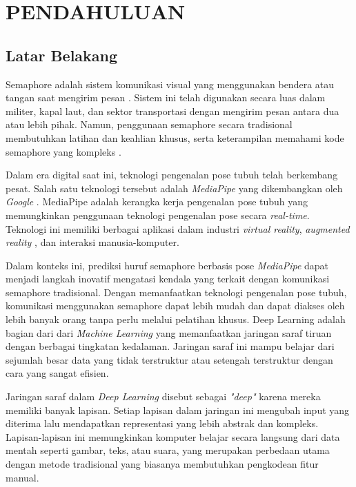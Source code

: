 \chapter{PENDAHULUAN}

\section{Latar Belakang}

Semaphore adalah sistem komunikasi visual yang menggunakan bendera atau tangan saat mengirim pesan \cite{howeth1963history}. Sistem ini telah digunakan secara luas dalam militer, kapal laut, dan sektor transportasi dengan mengirim pesan antara dua atau lebih pihak. Namun, penggunaan semaphore secara tradisional membutuhkan latihan dan keahlian khusus, serta keterampilan memahami kode semaphore yang kompleks \cite{zhao2016convolutional}.

Dalam era digital saat ini, teknologi pengenalan pose tubuh telah berkembang pesat. Salah satu teknologi tersebut adalah \textit{MediaPipe} yang dikembangkan oleh \textit{Google} \cite{huynh2020mediapipe}. MediaPipe adalah kerangka kerja pengenalan pose tubuh yang memungkinkan penggunaan teknologi pengenalan pose secara \textit{real-time}. Teknologi ini memiliki berbagai aplikasi dalam industri \textit{virtual reality}\cite{huynh2020mediapipe}, \textit{augmented reality} \cite{lugaresi2019mediapipe}, dan interaksi manusia-komputer. \cite{harris2021applying}

Dalam konteks ini, prediksi huruf semaphore berbasis pose \textit{MediaPipe} dapat menjadi langkah inovatif  mengatasi kendala yang terkait dengan komunikasi semaphore tradisional. Dengan memanfaatkan teknologi pengenalan pose tubuh, komunikasi menggunakan semaphore dapat lebih mudah dan dapat diakses oleh lebih banyak orang tanpa perlu melalui pelatihan khusus. \cite{singh2022realtime}
Deep Learning adalah  bagian dari dari \textit{Machine Learning} yang memanfaatkan jaringan saraf tiruan dengan berbagai tingkatan kedalaman. Jaringan saraf ini mampu belajar dari sejumlah besar data yang tidak terstruktur atau setengah terstruktur dengan cara yang sangat efisien. \cite{deng2014deep}

Jaringan saraf dalam \textit{Deep Learning} disebut sebagai \textit{"deep"} karena mereka memiliki banyak lapisan. Setiap lapisan dalam jaringan ini mengubah input yang diterima lalu mendapatkan representasi yang lebih abstrak dan kompleks. Lapisan-lapisan ini memungkinkan komputer belajar secara langsung dari data mentah seperti gambar, teks, atau suara, yang merupakan perbedaan utama dengan metode tradisional yang biasanya membutuhkan pengkodean fitur manual.

